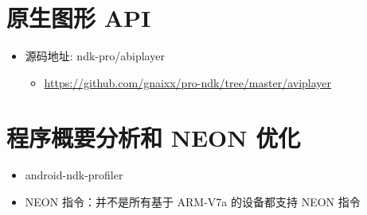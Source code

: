 \documentclass[9pt, b5paper]{article}
\begin{document}
\section{原生图形 API}
\label{sec-7}
\begin{itemize}
\item 源码地址: ndk-pro/abiplayer
\begin{itemize}
\item \url{https://github.com/gnaixx/pro-ndk/tree/master/aviplayer}
\end{itemize}
\end{itemize}
\section{程序概要分析和 NEON 优化}
\label{sec-8}
\begin{itemize}
\item android-ndk-profiler
\item NEON 指令：并不是所有基于 ARM-V7a 的设备都支持 NEON 指令
\end{itemize}
\end{document}
